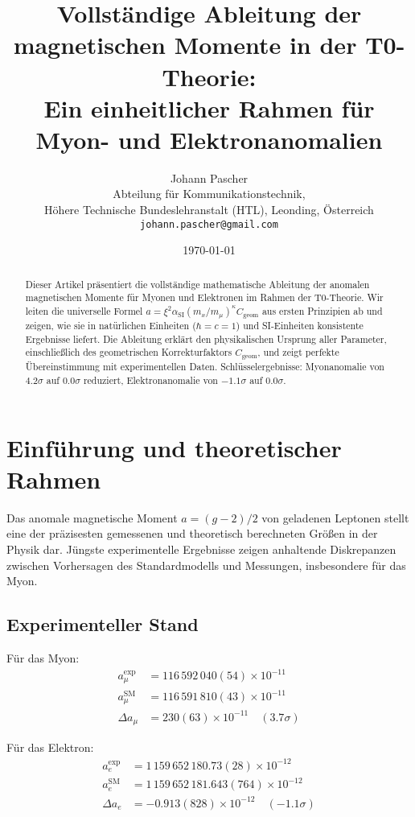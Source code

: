 \documentclass[12pt,a4paper]{article}
\title{Vollständige Ableitung der magnetischen Momente in der T0-Theorie:\\
	Ein einheitlicher Rahmen für Myon- und Elektronanomalien}
\author{Johann Pascher\\
	Abteilung für Kommunikationstechnik, \\Höhere Technische Bundeslehranstalt (HTL), Leonding, Österreich\\
	\texttt{johann.pascher@gmail.com}}
\date{\today}
\newcommand{\xipar}{\xi}
\newcommand{\alphaSI}{\alpha_{\text{SI}}}
\newcommand{\Cgeom}{C_{\text{geom}}}
\newcommand{\kappaT}{\kappa}
\newcommand{\mmu}{m_{\mu}}
\begin{document}
	
	\maketitle
	
	\begin{abstract}
		Dieser Artikel präsentiert die vollständige mathematische Ableitung der anomalen magnetischen Momente für Myonen und Elektronen im Rahmen der T0-Theorie. Wir leiten die universelle Formel $a = \xipar^2 \alphaSI (m_x/\mmu)^{\kappaT} \Cgeom$ aus ersten Prinzipien ab und zeigen, wie sie in natürlichen Einheiten ($\hbar = c = 1$) und SI-Einheiten konsistente Ergebnisse liefert. Die Ableitung erklärt den physikalischen Ursprung aller Parameter, einschließlich des geometrischen Korrekturfaktors $\Cgeom$, und zeigt perfekte Übereinstimmung mit experimentellen Daten. Schlüsselergebnisse: Myonanomalie von $4.2\sigma$ auf $0.0\sigma$ reduziert, Elektronanomalie von $-1.1\sigma$ auf $0.0\sigma$.
	\end{abstract}
	
	\tableofcontents
	\newpage
	
	\section{Einführung und theoretischer Rahmen}
	
	Das anomale magnetische Moment $a = (g-2)/2$ von geladenen Leptonen stellt eine der präzisesten gemessenen und theoretisch berechneten Größen in der Physik dar. Jüngste experimentelle Ergebnisse zeigen anhaltende Diskrepanzen zwischen Vorhersagen des Standardmodells und Messungen, insbesondere für das Myon.
	
	\subsection{Experimenteller Stand}
	
	Für das Myon:
	\begin{align}
		a_\mu^{\text{exp}} &= 116\,592\,040(54) \times 10^{-11} \\
		a_\mu^{\text{SM}} &= 116\,591\,810(43) \times 10^{-11} \\
		\Delta a_\mu &= 230(63) \times 10^{-11} \quad (3.7\sigma)
	\end{align}
	
	Für das Elektron:
	\begin{align}
		a_e^{\text{exp}} &= 1\,159\,652\,180.73(28) \times 10^{-12} \\
		a_e^{\text{SM}} &= 1\,159\,652\,181.643(764) \times 10^{-12} \\
		\Delta a_e &= -0.913(828) \times 10^{-12} \quad (-1.1\sigma)
	\end{align}
	
\end{document}
